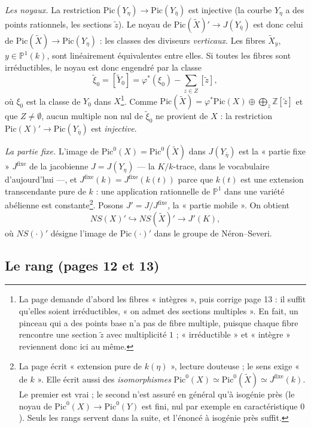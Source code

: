 \documentclass[11pt,a4paper]{article}
\begin{document}
\emph{Les noyaux.} La restriction
$\mathrm{Pic}(Y_\eta) \to \mathrm{Pic}(Y_{\bar\eta})$ est injective (la
courbe $Y_\eta$ a des points rationnels, les sections $\tilde z$). Le noyau
de $\mathrm{Pic}(\tilde X)' \to J(Y_{\bar\eta})$ est donc celui de
$\mathrm{Pic}(\tilde X) \to \mathrm{Pic}(Y_\eta)$ : les classes des diviseurs
\emph{verticaux}. Les fibres $\tilde X_y$, $y \in \mathbb{P}^1(k)$, sont
linéairement équivalentes entre elles. Si toutes les fibres sont
irréductibles, le noyau est donc engendré par la classe
\[
  \tilde\xi_0 = [\tilde Y_0] = \varphi^*(\xi_0) - \sum_{z \in Z} [\tilde z],
\]
où $\xi_0$ est la classe de $Y_0$ dans $X$\footnote{La page demande
d'abord les fibres « intègres », puis corrige page 13 : il suffit
qu'elles soient irréductibles, « on admet des sections multiples ». En fait,
un pinceau qui a des points base n'a pas de fibre multiple, puisque chaque
fibre rencontre une section $\tilde z$ avec multiplicité $1$ ;
« irréductible » et « intègre » reviennent donc ici au même.}. Comme
$\mathrm{Pic}(\tilde X) = \varphi^*\mathrm{Pic}(X) \oplus
\bigoplus_{z} \mathbb{Z}[\tilde z]$ et que $Z \neq \emptyset$, aucun multiple
non nul de $\tilde\xi_0$ ne provient de $X$ : la restriction
$\mathrm{Pic}(X)' \to \mathrm{Pic}(Y_{\bar\eta})$ est \emph{injective}.

\emph{La partie fixe.} L'image de
$\mathrm{Pic}^0(X) = \mathrm{Pic}^0(\tilde X)$ dans $J(Y_{\bar\eta})$ est
la « partie fixe » $J^{\mathrm{fixe}}$ de la jacobienne $J = J(Y_\eta)$ —
la $K/k$-trace, dans le vocabulaire d'aujourd'hui —, et
$J^{\mathrm{fixe}}(k) = J^{\mathrm{fixe}}(k(t))$ parce que $k(t)$ est une
extension transcendante pure de $k$ : une application rationnelle de
$\mathbb{P}^1$ dans une variété abélienne est constante\footnote{La page
écrit « extension pure de $k(\eta)$ », lecture douteuse ; le sens exige
« de $k$ ». Elle écrit aussi des \emph{isomorphismes}
$\mathrm{Pic}^0(X) \simeq \mathrm{Pic}^0(\tilde X) \simeq
J^{\mathrm{fixe}}(k)$. Le premier est vrai ; le second n'est assuré en
général qu'à isogénie près (le noyau de $\mathrm{Pic}^0(X) \to
\mathrm{Pic}^0(Y)$ est fini, nul par exemple en caractéristique $0$). Seuls
les rangs servent dans la suite, et l'énoncé à isogénie près suffit.}.
Posons $J' = J / J^{\mathrm{fixe}}$, la « partie mobile ». On obtient
\[
  NS(X)' \hookrightarrow NS(\tilde X)' \longrightarrow J'(K),
\]
où $NS(\cdot)'$ désigne l'image de $\mathrm{Pic}(\cdot)'$ dans le groupe de
Néron–Severi.

\subsection*{Le rang (pages 12 et 13)}
\end{document}
